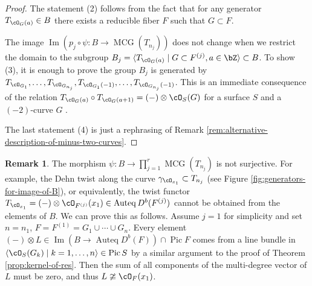 \documentclass{amsart}
\makeatletter
\numberwithin{equation}{section}
\theoremstyle{plain}
\theoremstyle{definition}
\newtheorem{remark}[theorem]{Remark}
\DeclareMathOperator{\Auteq}{\mathrm{Auteq}}
\DeclareMathOperator{\Pic}{\mathrm{Pic}}
\DeclareMathOperator{\MCG}{\mathrm{MCG}}
\DeclareMathOperator{\PMCG}{\mathrm{PMCG}}
\DeclareMathOperator{\Image}{\mathrm{Im}}
\newcommand*{\rom}[1]{\expandafter\@slowromancap\romannumeral #1@}
\makeatother
\begin{document}
\begin{proof}
    The statement (2) follows from the fact that for any generator $T_{\cO_G(a)} \in B$ there exists a reducible fiber $F$ such that $G \subset F$.

    The image $\Image(p_j \circ \psi \colon B \to \MCG(T_{n_j}))$ does not change when we restrict the domain to the subgroup $B_j = \langle T_{\cO_G(a)} \mid G \subset F^{(j)}, a \in \bZ \rangle \subset B$.
    To show (3), it is enough to prove the group $B_j$ is generated by $T_{\cO_{G_1}}, \dots, T_{\cO_{G_{n_j}}}, T_{\cO_{G_1}(-1)}, \dots, T_{\cO_{G_{n_j}}(-1)}$.
    This is an immediate consequence of the relation $T_{\cO_G(a)} \circ T_{\cO_G(a+1)} = (-)\otimes \cO_S(G)$ for a surface $S$ and a $(-2)$-curve $G$ \cite[Lemma 4.15 (i)]{MR2198807}.

    The last statement (4) is just a rephrasing of Remark \ref{rem:alternative-description-of-minus-two-curves}.
\end{proof}


\begin{remark}\label{rm:psi-is-not-surjective}
    The morphism $\psi \colon B \to \prod_{j=1}^r \MCG(T_{n_j})$ is not surjective.
    For example, the Dehn twist along the curve $\gamma_{\cO_{x_1}} \subset T_{n_j}$ (see Figure \ref{fig:generators-for-image-of-B}),
    or equivalently,
    the twist functor $T_{\cO_{x_1}} = (-)\otimes \cO_{F^{(j)}}(x_1) \in \Auteq{D^b(F^{(j)})}$ cannot be obtained from the elements of $B$.
    We can prove this as follows.
    Assume $j = 1$ for simplicity and set $n = n_1$, $F = F^{(1)} = G_1 \cup \cdots \cup G_n$.
    Every element $(-) \otimes L \in \Image(B \to \Auteq D^b(F)) \cap \Pic F$ comes from a line bundle in $\langle \cO_S(G_k) \mid k = 1, \dots, n\rangle \in \Pic S$ by a similar argument to the proof of Theorem \ref{prop:kernel-of-res}.
    Then the sum of all components of the multi-degree vector of $L$ must be zero, and thus $L \ncong \cO_{F}(x_1)$.
\end{remark}

\end{document}
